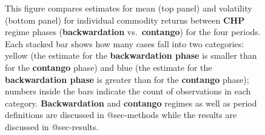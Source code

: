 \documentclass[
  authoryear,
  preprint,
  3p]{elsarticle}
\begin{document}
\newpage

\begin{figure}


\caption{\label{fig-regimes}This figure compares estimates for mean (top
panel) and volatility (bottom panel) for individual commodity returns
between \textbf{CHP} regime phases (\textbf{backwardation}
vs.~\textbf{contango}) for the four periods. Each stacked bar shows how
many cases fall into two categories: yellow (the estimate for the
\textbf{backwardation phase} is smaller than for the \textbf{contango}
phase) and blue (the estimate for the \textbf{backwardation phase} is
greater than for the \textbf{contango} phase); numbers inside the bars
indicate the count of observations in each category.
\textbf{Backwardation} and \textbf{contango} regimes as well as period
definitions are discussed in @sec-methods while the results are
discussed in @sec-results.}

\end{figure}%
\end{document}
